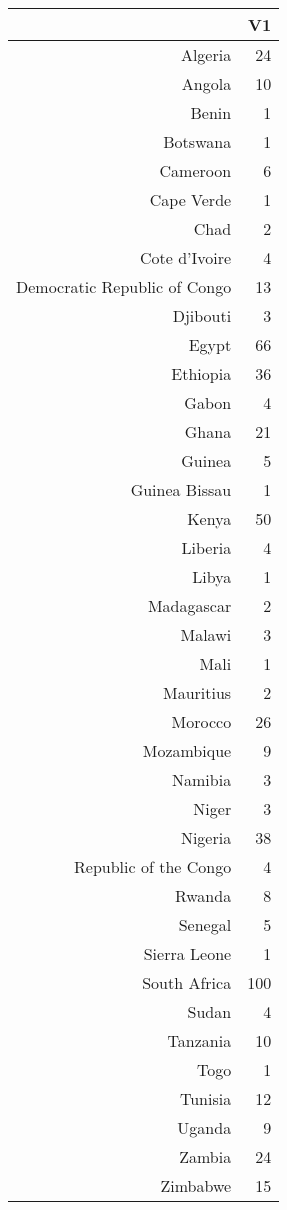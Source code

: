 \begin{table}[ht]
\centering
\begin{tabular}{rr}
  \hline
 & V1 \\ 
  \hline
Algeria &  24 \\ 
  Angola &  10 \\ 
  Benin &   1 \\ 
  Botswana &   1 \\ 
  Cameroon &   6 \\ 
  Cape Verde &   1 \\ 
  Chad &   2 \\ 
  Cote d'Ivoire &   4 \\ 
  Democratic Republic of Congo &  13 \\ 
  Djibouti &   3 \\ 
  Egypt &  66 \\ 
  Ethiopia &  36 \\ 
  Gabon &   4 \\ 
  Ghana &  21 \\ 
  Guinea &   5 \\ 
  Guinea Bissau &   1 \\ 
  Kenya &  50 \\ 
  Liberia &   4 \\ 
  Libya &   1 \\ 
  Madagascar &   2 \\ 
  Malawi &   3 \\ 
  Mali &   1 \\ 
  Mauritius &   2 \\ 
  Morocco &  26 \\ 
  Mozambique &   9 \\ 
  Namibia &   3 \\ 
  Niger &   3 \\ 
  Nigeria &  38 \\ 
  Republic of the Congo &   4 \\ 
  Rwanda &   8 \\ 
  Senegal &   5 \\ 
  Sierra Leone &   1 \\ 
  South Africa & 100 \\ 
  Sudan &   4 \\ 
  Tanzania &  10 \\ 
  Togo &   1 \\ 
  Tunisia &  12 \\ 
  Uganda &   9 \\ 
  Zambia &  24 \\ 
  Zimbabwe &  15 \\ 
   \hline
\end{tabular}
\end{table}
